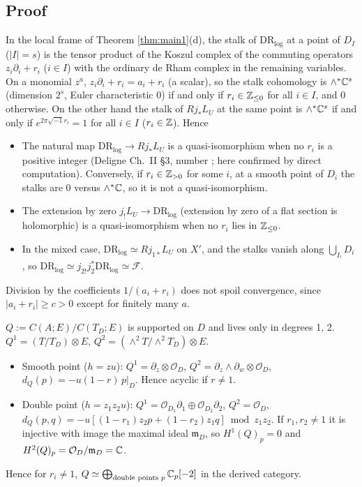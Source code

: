 \subsection{Proof}
\begin{lem}\tP \tC\label{lem:stalk}
In the local frame of Theorem \ref{thm:main1}(d), the stalk of $\mathrm{DR}_{\log}$ at a point of $D_I$ ($|I|=s$) is the tensor product of the Koszul complex of the commuting operators $z_i\partial_i+r_i$ ($i\in I$) with the ordinary de Rham complex in the remaining variables. On a monomial $z^a$, $z_i\partial_i+r_i=a_i+r_i$ (a scalar), so the stalk cohomology is $\wedge^*\mathbb C^s$ (dimension $2^s$, Euler characteristic 0) if and only if $r_i\in\mathbb Z_{\le0}$ for all $i\in I$, and 0 otherwise. On the other hand the stalk of $Rj_*L_U$ at the same point is $\wedge^*\mathbb C^s$ if and only if $e^{2\pi\sqrt{-1}r_i}=1$ for all $i\in I$ ($r_i\in\mathbb Z$). Hence
\begin{itemize}
\item The natural map $\mathrm{DR}_{\log}\to Rj_*L_U$ is a quasi-isomorphism when no $r_i$ is a positive integer (Deligne \cite{Del} Ch.~II \S3, number \tQ; here confirmed by direct computation). Conversely, if $r_i\in\mathbb Z_{>0}$ for some $i$, at a smooth point of $D_i$ the stalks are $0$ versus $\wedge^*\mathbb C$, so it is not a quasi-isomorphism.
\item The extension by zero $j_!L_U\to\mathrm{DR}_{\log}$ (extension by zero of a flat section is holomorphic) is a quasi-isomorphism when no $r_i$ lies in $\mathbb Z_{\le0}$.
\item In the mixed case, $\mathrm{DR}_{\log}\simeq Rj_{1*}L_U$ on $X'$, and the stalks vanish along $\bigcup_{I_!}D_i$, so $\mathrm{DR}_{\log}\simeq j_{2!}j_2^*\mathrm{DR}_{\log}\simeq\mathcal F$.
\end{itemize}
Division by the coefficients $1/(a_i+r_i)$ does not spoil convergence, since $|a_i+r_i|\ge c>0$ except for finitely many $a$.
\end{lem}
\begin{lem}\tP \tV\label{lem:Q}
$Q:=C(A;E)/C(T_D;E)$ is supported on $D$ and lives only in degrees 1, 2. $Q^1=(T/T_D)\otimes E$, $Q^2=(\wedge^2T/\wedge^2T_D)\otimes E$.
\begin{itemize}
\item Smooth point ($h=zu$): $Q^1=\partial_z\otimes\mathcal O_D$, $Q^2=\partial_z\wedge\partial_w\otimes\mathcal O_D$, $d_Q(p)=-u(1-r)\,p|_D$. Hence acyclic if $r\ne1$.
\item Double point ($h=z_1z_2u$): $Q^1=\mathcal O_{D_1}\partial_1\oplus\mathcal O_{D_2}\partial_2$, $Q^2=\mathcal O_D$, $d_Q(p,q)=-u[(1-r_1)z_2p+(1-r_2)z_1q]\bmod z_1z_2$. If $r_1,r_2\ne1$ it is injective with image the maximal ideal $\mathfrak m_D$, so $H^1(Q)_p=0$ and $H^2(Q)_p=\mathcal O_D/\mathfrak m_D=\mathbb C$.
\end{itemize}
Hence for $r_i\ne1$, $Q\simeq\bigoplus_{\text{double points }p}\mathbb C_p[-2]$ in the derived category.
\end{lem}
